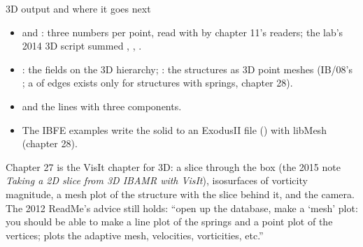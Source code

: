\documentclass[aspectratio=169,11pt]{beamer}
\begin{document}
\begin{frame}{3D output and where it goes next}
\label{fr:output}
\small
\begin{itemize}
  \item {} and : three numbers per point, read with  by chapter 11's readers; the lab's 2014 3D script summed , , .
  \item {}: the fields on the 3D hierarchy; : the structures as 3D point meshes (IB/08's ; a  of edges exists only for structures with springs, chapter 28).
  \item {} and the  lines with three components.
  \item The IBFE examples write the solid to an ExodusII file () with libMesh (chapter 28).
\end{itemize}
\vspace{1mm}
\footnotesize Chapter 27 is the VisIt chapter for 3D: a slice through the box (the 2015 note \emph{Taking a 2D slice from 3D IBAMR with VisIt}), isosurfaces of vorticity magnitude, a mesh plot of the structure with the slice behind it, and the camera. The 2012 ReadMe's advice still holds: ``open up the  database, make a `mesh' plot: you should be able to make a line plot of the springs and a point plot of the vertices;  plots the adaptive mesh, velocities, vorticities, etc.''
\end{frame}
\end{document}
